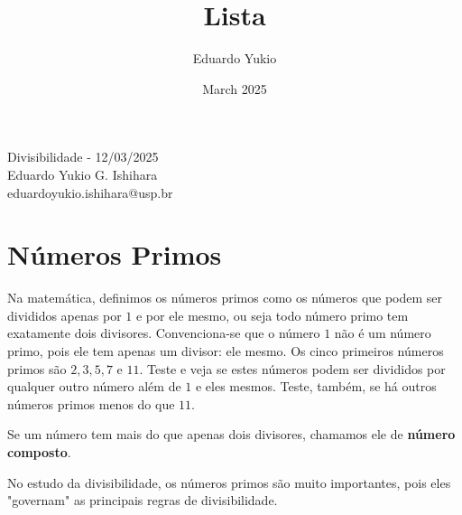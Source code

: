 \documentclass[12pt]{report}
\title{Lista}
\author{Eduardo Yukio}
\date{March 2025}
\newcommand{\1}{\faThermometerEmpty}
\newcommand{\2}{\faThermometerQuarter}
\newcommand{\3}{\faThermometerHalf}
\newcommand{\4}{\faThermometerThreeQuarters}
\newcommand{\5}{\faThermometerFull}
\begin{document}
\begin{center}
{\Large Divisibilidade - 12/03/2025} \\
\vspace{1mm}
Eduardo Yukio G. Ishihara \\
{\footnotesize eduardoyukio.ishihara@usp.br}
\end{center}
\vspace{5mm}

\section*{Números Primos}
Na matemática, definimos os números primos como os números que podem ser divididos apenas por $1$ e por ele mesmo, ou seja todo número primo tem exatamente dois divisores. Convenciona-se que o número $1$ não é um número primo, pois ele tem apenas um divisor: ele mesmo. Os cinco primeiros números primos são $2,3,5,7$ e $11$. Teste e veja se estes números podem ser divididos por qualquer outro número além de $1$ e eles mesmos. Teste, também, se há outros números primos menos do que $11$.

Se um número tem mais do que apenas dois divisores, chamamos ele de \textbf{número composto}. 

No estudo da divisibilidade, os números primos são muito importantes, pois eles "governam" as principais regras de divisibilidade.
\end{document}
